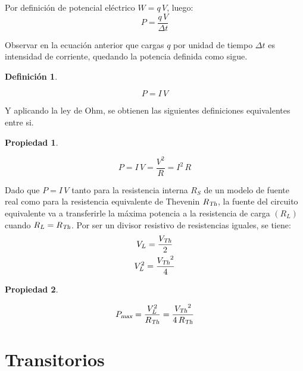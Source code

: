 \documentclass[a5paper,12pt,twoside]{book}
\newtheorem{defn}{{Definición}}[chapter]
\newtheorem{prop}{{Propiedad}}[chapter]
\begin{document}
Por definición de potencial eléctrico $W = q \, V$, luego:
\begin{equation*}
    P = \frac{q \, V}{\Delta t}
\end{equation*}

Observar en la ecuación anterior que cargas $q$ por unidad de tiempo $\Delta t$ es intensidad de corriente, quedando la potencia definida como sigue.

\begin{mdframed}[style=MyFrame1]
    \begin{defn}
    \end{defn}
    \begin{equation*}
        P = I \, V
    \end{equation*}
\end{mdframed}

Y aplicando la ley de Ohm, se obtienen las siguientes definiciones equivalentes entre si.

\begin{mdframed}[style=MyFrame1]
    \begin{prop}
    \end{prop}
    \begin{equation*}
        P = I \, V = \frac{V^2}{R} = I^2 \, R
    \end{equation*}
\end{mdframed}

Dado que $P = I \, V$ tanto para la resistencia interna $R_S$ de un modelo de fuente real como para la resistencia equivalente de Thevenin ${{R}_\textsl{{Th}}}$, la fuente del circuito equivalente va a transferirle la máxima potencia a la resistencia de carga $(R_L)$ cuando $R_L={{R}_\textsl{{Th}}}$.
Por ser un divisor resistivo de resistencias iguales, se tiene:
\begin{gather*}
    V_L = \frac{{{V}_\textsl{{Th}}}}{2}
    \\
    V_L^2 = \frac{{{V}_\textsl{{Th}}}^2}{4}
\end{gather*}

\begin{mdframed}[style=MyFrame1]
    \begin{prop}
    \end{prop}
    \begin{equation*}
        {{P}_\textsl{{max}}} = \frac{V_L^2}{{{R}_\textsl{{Th}}}} = \frac{{{V}_\textsl{{Th}}}^2}{4 \, {{R}_\textsl{{Th}}}}
    \end{equation*}
\end{mdframed}


\chapter{Transitorios}
\end{document}
